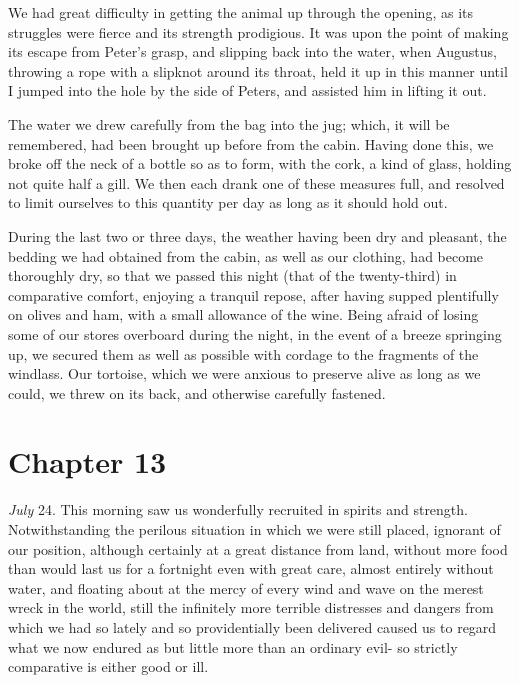 We had great difficulty in getting the animal up through the opening, as its
struggles were fierce and its strength prodigious. It was upon the point of
making its escape from Peter's grasp, and slipping back into the water, when
Augustus, throwing a rope with a slipknot around its throat, held it up in this
manner until I jumped into the hole by the side of Peters, and assisted him in
lifting it out. 

The water we drew carefully from the bag into the jug; which, it will be
remembered, had been brought up before from the cabin. Having done this, we
broke off the neck of a bottle so as to form, with the cork, a kind of glass,
holding not quite half a gill. We then each drank one of these measures full,
and resolved to limit ourselves to this quantity per day as long as it should
hold out. 

During the last two or three days, the weather having been dry and pleasant,
the bedding we had obtained from the cabin, as well as our clothing, had become
thoroughly dry, so that we passed this night (that of the twenty-third) in
comparative comfort, enjoying a tranquil repose, after having supped plentifully
on olives and ham, with a small allowance of the wine. Being afraid of losing
some of our stores overboard during the night, in the event of a breeze
springing up, we secured them as well as possible with cordage to the fragments
of the windlass. Our tortoise, which we were anxious to preserve alive as long
as we could, we threw on its back, and otherwise carefully fastened. 

\section{Chapter 13}
\emph{July} 24. This morning saw us wonderfully recruited in spirits and
strength. Notwithstanding the perilous situation in which we were still placed,
ignorant of our position, although certainly at a great distance from land,
without more food than would last us for a fortnight even with great care,
almost entirely without water, and floating about at the mercy of every wind and
wave on the merest wreck in the world, still the infinitely more terrible
distresses and dangers from which we had so lately and so providentially been
delivered caused us to regard what we now endured as but little more than an
ordinary evil- so strictly comparative is either good or ill. 

